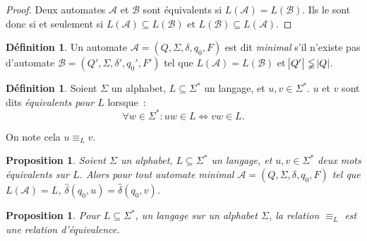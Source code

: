 \documentclass{article}
\newtheorem{prp}[thm]{Proposition}
\theoremstyle{definition}
\newtheorem{déf}[thm]{Définition}
\theoremstyle{remark}
\newcommand{\automaton}{(Q, \Sigma, \delta, q_0, F)}
\begin{document}
	\begin{proof} Deux automates $\mathcal A$ et $\mathcal B$ sont équivalents si $L(\mathcal A) = L(\mathcal B)$. Ils le sont donc si et seulement si
	$L(\mathcal A) \subseteq L(\mathcal B)$ et $L(\mathcal B) \subseteq L(\mathcal A)$.
	\end{proof}

	\begin{déf} Un automate $\mathcal A = \automaton$ est dit \textit{minimal} s'il n'existe pas d'automate $\mathcal B = (Q', \Sigma, \delta', q_0', F')$
	tel que $L(\mathcal A) = L(\mathcal B)$ et $\abs {Q'} \lneqq \abs Q$.
	\end{déf}

	\begin{déf} Soient $\Sigma$ un alphabet, $L \subseteq \Sigma^*$ un langage, et $u, v \in \Sigma^*$. $u$ et $v$ sont dits \textit{équivalents pour $L$}
	lorsque~:
	\[\forall w \in \Sigma^* : uw \in L \iff vw \in L.\]

	On note cela $u \equiv_L v$.
	\end{déf}

	\begin{prp} Soient $\Sigma$ un alphabet, $L \subseteq \Sigma^*$ un langage, et $u, v \in \Sigma^*$ deux mots équivalents sur $L$.
	Alors pour tout automate minimal $\mathcal A = \automaton$ tel que $L(\mathcal A) = L$, $\hat \delta(q_0, u) = \hat \delta(q_0, v)$.
	\end{prp}

	\begin{prp} Pour $L \subseteq \Sigma^*$, un langage sur un alphabet $\Sigma$, la relation $\equiv_L$ est une relation d'équivalence.
	\end{prp}
\end{document}
